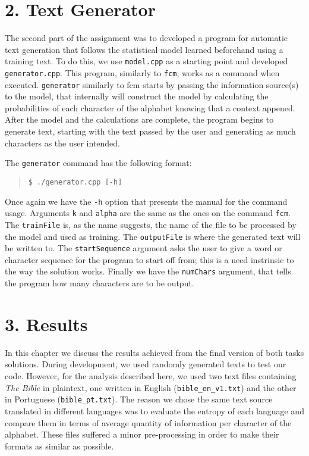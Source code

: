 \documentclass[12pt]{article}
\begin{document}
\section*{2. Text Generator}

The second part of the assignment was to developed a program for automatic
text generation that follows the statistical model learned beforehand using 
a training text.
To do this, we use \texttt{model.cpp} as a starting point and developed 
\texttt{generator.cpp}. 
This program, similarly to \texttt{fcm}, works as a command when executed.
\texttt{generator} similarly to fcm starts by passing the information source(s) to the model, that
internally will construct the model by calculating the probabilities of each character of the alphabet
knowing that a context appened. After the model and the calculations are complete, the program begins to generate text,
starting with the text passed by the user and generating as much characters as the user intended.

The \texttt{generator} command has the following format: 

\begin{quote}
\begin{verbatim}
$ ./generator.cpp [-h] 
\end{verbatim}
\end{quote}

Once again we have the \texttt{-h} option that presents the manual for the 
command usage.
Arguments \texttt{k} and \texttt{alpha} are the same as the ones on the 
command \texttt{fcm}.
The \texttt{trainFile} is, as the name suggests, the name of the file to be
processed by the model and used as training.
The \texttt{outputFile} is where the generated text will be written to.
The \texttt{startSequence} argument asks the user to give a word or character
sequence for the program to start off from; this is a need instrinsic to the
way the solution works.
Finally we have the \texttt{numChars} argument, that tells the program how 
many characters are to be output.

\section*{3. Results}

In this chapter we discuss the results achieved from the final version of 
both tasks solutions. 
During development, we used randomly generated texts to test our code.
However, for the analysis described here, we used two text files
containing {\it The Bible\/} in plaintext, one written in English 
(\texttt{bible\_en\_v1.txt}) and the other in Portuguese 
(\texttt{bible\_pt.txt}).
The reason we chose the same text source translated in different languages
was to evaluate the entropy of each language and compare them in terms of 
average quantity of information per character of the alphabet.
These files suffered a minor pre-processing in order to make their formats 
as similar as possible.
\end{document}
